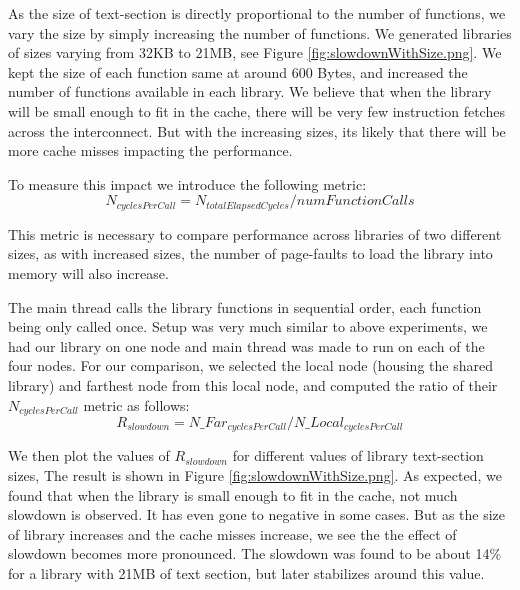 As the size of text-section is directly proportional to the number of functions, we vary the size by simply 
increasing the number of functions. We generated libraries of sizes varying from 32KB to 21MB, see Figure \ref{fig:slowdownWithSize.png}.
We kept the size of each function same at around 600 Bytes, and increased the number of functions available in each library.
We believe that when the library will be small enough to fit in the cache, there will be very few instruction fetches across the interconnect.
But with the increasing sizes, its likely that there will be more cache misses impacting the performance.

To measure this impact we introduce the following metric:
\begin{dmath}
\label{eqn:cyclesPerCall}
N_{cyclesPerCall} =  N_{totalElapsedCycles} / numFunctionCalls
\end{dmath}

This metric is necessary to compare performance across libraries of two different sizes, as with increased sizes, the number
of page-faults to load the library into memory will also increase.

The main thread calls the library functions in sequential order, each function being only called once.
Setup was very much similar to above experiments, we had our library on one node and main thread was made to run on 
each of the four nodes. For our comparison, we selected the local node (housing the shared library) and farthest node
from this local node, and computed the ratio of their $N_{cyclesPerCall}$ metric as follows:
\begin{dmath}
\label{eqn:slowdown}
R_{slowdown} =  N\_Far_{cyclesPerCall} / N\_Local_{cyclesPerCall}
\end{dmath}

We then plot the values of $R_{slowdown}$ for different values of library text-section sizes,
The result is shown in Figure \ref{fig:slowdownWithSize.png}.
As expected, we found that when the library is small enough to fit in the cache, not much slowdown is observed.
It has even gone to negative in some cases. But as the size of library increases and the cache misses increase,
we see the the effect of slowdown becomes more pronounced. The slowdown was found to be about 14\% for a library
with 21MB of text section, but later stabilizes around this value.

